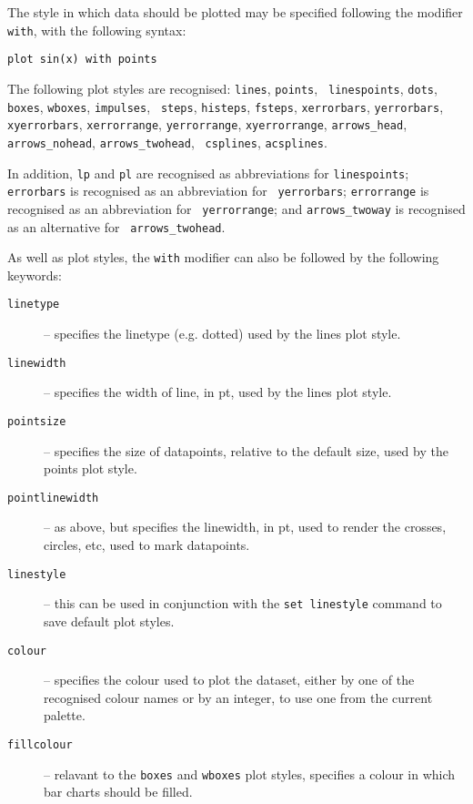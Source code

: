 \documentclass[a4paper,onecolumn,11pt]{book}
\begin{document}
The style in which data should be plotted may be specified following the
modifier {\tt with}, with the following syntax:

\begin{verbatim}
plot sin(x) with points
\end{verbatim}

The following plot styles are recognised: {\tt lines}, {\tt points}, {\tt
linespoints}, {\tt dots}, {\tt boxes}, {\tt wboxes}, {\tt impulses}, {\tt
steps}, {\tt histeps}, {\tt fsteps}, {\tt xerrorbars}, {\tt yerrorbars}, {\tt
xyerrorbars}, {\tt xerrorrange}, {\tt yerrorrange}, {\tt xyerrorrange},
\newline\noindent %
{\tt arrows\_head}, {\tt arrows\_nohead}, {\tt arrows\_twohead}, {\tt
csplines}, {\tt acsplines}.

In addition, {\tt lp} and {\tt pl} are recognised as abbreviations
for {\tt linespoints}; {\tt errorbars} is recognised as an abbreviation for {\tt
yerrorbars}; {\tt errorrange} is recognised as an abbreviation for {\tt
yerrorrange}; and {\tt arrows\_twoway} is recognised as an alternative for {\tt
arrows\_twohead}.

As well as plot styles, the {\tt with} modifier can also be followed by the
following keywords:

\begin{description}
\item[{\tt linetype}] -- specifies the linetype (e.g. dotted) used by the lines plot style. 
\item[{\tt linewidth}] -- specifies the width of line, in pt, used by the lines plot style.
\item[{\tt pointsize}] -- specifies the size of datapoints, relative to the
default size, used by the points plot style. 
\item[{\tt pointlinewidth}] -- as above, but specifies the linewidth, in pt,
used to render the crosses, circles, etc, used to mark datapoints. 
\item[{\tt linestyle}] -- this can be used in conjunction with the {\tt set linestyle} command to save default plot styles. 
\item[{\tt colour}] -- specifies the colour used to plot the dataset, either by
one of the recognised colour names or by an integer,
to use one from the current palette.  \item[{\tt fillcolour}] -- relavant to the
{\tt boxes} and {\tt wboxes} plot
styles, specifies a colour in which bar charts should be filled.
\end{description}
\end{document}
